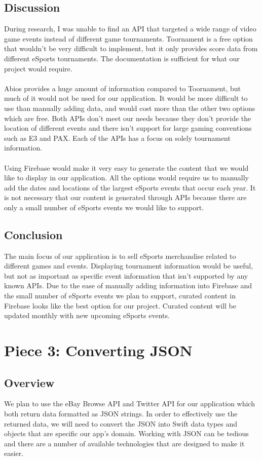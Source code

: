\documentclass[onecolumn, draftclsnofoot,10pt, compsoc]{IEEEtran}
\begin{document}
\subsection{Discussion}
During research, I was unable to find an API that targeted a wide range of video game events instead of different game tournaments. 
Toornament is a free option that wouldn't be very difficult to implement, but it only provides score data from different eSports tournaments. 
The documentation is sufficient for what our project would require. \\ \\
\indent Abios provides a huge amount of information compared to Toornament, but much of it would not be used for our application. 
It would be more difficult to use than manually adding data, and would cost more than the other two options which are free.  
Both APIs don't meet our needs because they don't provide the location of different events and there isn't support for large gaming conventions such as E3 and PAX. 
Each of the APIs has a focus on solely tournament information. \\ \\
\indent Using Firebase would make it very easy to generate the content that we would like to display in our application.
All the options would require us to manually add the dates and locations of the largest eSports events that occur each year. 
It is not necessary that our content is generated through APIs because there are only a small number of eSports events we would like to support. 
\subsection{Conclusion}
The main focus of our application is to sell eSports merchandise related to different games and events. 
Displaying tournament information would be useful, but not as important as specific event information that isn't supported by any known APIs.
Due to the ease of manually adding information into Firebase and the small number of eSports events we plan to support, curated content in Firebase looks like the best option for our project.  
Curated content will be updated monthly with new upcoming eSports events.  

\section{Piece 3: Converting JSON}
\subsection{Overview}
We plan to use the eBay Browse API and Twitter API for our application which both return data formatted as JSON strings. 
In order to effectively use the returned data, we will need to convert the JSON into Swift data types and objects that are specific our app’s domain.
Working with JSON can be tedious and there are a number of available technologies that are designed to make it easier.
\end{document}
